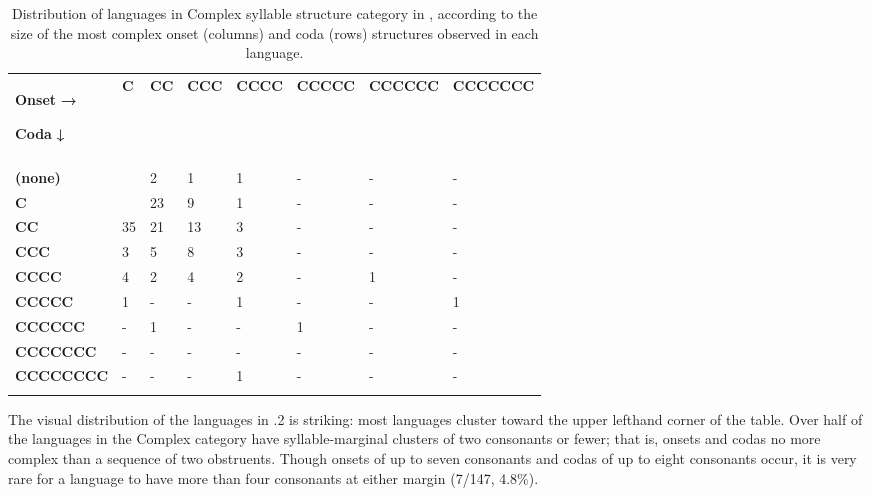 \begin{table}
\begin{tabularx}{\textwidth}{XXXXXXXX}
\lsptoprule
{ \textbf{Onset} \textbf{→}}

 \textbf{Coda} \textbf{↓} & \textbf{C} & \textbf{CC} & \textbf{CCC} & \textbf{CCCC} & \textbf{CCCCC} & \textbf{CCCCCC} & \textbf{CCCCCCC}\\
&  &  &  &  &  &  & \\
 \textbf{(none)} &  & 2 & 1 & 1 & {}- & {}- & {}-\\
\hhline{-~------}
 \textbf{C} &  & 23 & 9 & 1 & {}- & {}- & {}-\\
 \textbf{CC} & 35 & 21 & 13 & 3 & {}- & {}- & {}-\\
 \textbf{CCC} & 3 & 5 & 8 & 3 & {}- & {}- & {}-\\
 \textbf{CCCC} & 4 & 2 & 4 & 2 & {}- & 1 & {}-\\
 \textbf{CCCCC} & 1 & {}- & {}- & 1 & {}- & {}- & 1\\
 \textbf{CCCCCC} & {}- & 1 & {}- & {}- & 1 & {}- & {}-\\
 \textbf{CCCCCCC} & {}- & {}- & {}- & {}- & {}- & {}- & {}-\\
 \textbf{CCCCCCCC} & {}- & {}- & {}- & 1 & {}- & {}- & {}-\\
\lspbottomrule
\end{tabularx}
\caption{\label{tab:key:2.2.} Distribution of languages in Complex syllable structure category in \citet{Maddieson2013a}, according to the size of the most complex onset (columns) and coda (rows) structures observed in each language.}
\end{table}




  The visual distribution of the languages in .2 is striking: most languages cluster toward the upper lefthand corner of the table. Over half of the languages in the Complex category have syllable-marginal clusters of two consonants or fewer; that is, onsets and codas no more complex than a sequence of two obstruents. Though onsets of up to seven consonants and codas of up to eight consonants occur, it is very rare for a language to have more than four consonants at either margin (7/147, 4.8\%).



